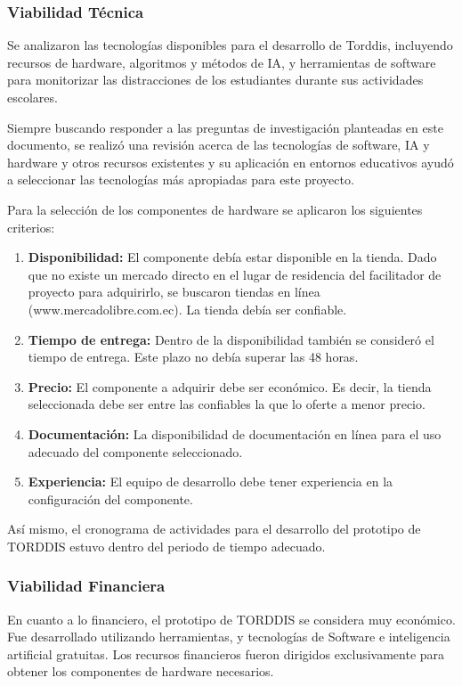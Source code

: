 \documentclass[a4paper,fleqn]{cas-sc}
\begin{document}
				\subsubsection*{Viabilidad Técnica}
					Se analizaron las tecnologías disponibles para el desarrollo de Torddis, incluyendo recursos de hardware, algoritmos y métodos de IA, y herramientas de software para monitorizar las distracciones de los estudiantes durante sus actividades escolares.
					
					Siempre buscando responder a las preguntas de investigación planteadas en este documento, se realizó una revisión acerca de las tecnologías de software, IA y hardware y otros recursos existentes y su aplicación en entornos educativos ayudó a seleccionar las tecnologías más apropiadas para este proyecto.
					
					Para la selección de los componentes de hardware se aplicaron los siguientes criterios:
					
					\begin{enumerate}
						\item \textbf{Disponibilidad:} El componente debía estar disponible en la tienda. Dado que no existe un mercado directo en el lugar de residencia del facilitador de proyecto para adquirirlo, se buscaron tiendas en línea (www.mercadolibre.com.ec). La tienda debía ser confiable. 
						\item \textbf{Tiempo de entrega:} Dentro de la disponibilidad también se consideró el tiempo de entrega. Este plazo no debía superar las 48 horas.
						\item \textbf{Precio:} El componente a adquirir debe ser económico. Es decir, la tienda seleccionada debe ser entre las confiables la que lo oferte a menor precio.
						\item \textbf{Documentación:} La disponibilidad de documentación en línea para el uso adecuado del componente seleccionado.
						\item \textbf{Experiencia:} El equipo de desarrollo debe tener experiencia en la configuración del componente.
					\end{enumerate}
					
					Así mismo, el cronograma de actividades para el desarrollo del prototipo de TORDDIS estuvo dentro del periodo de tiempo adecuado.
				
				\subsubsection*{Viabilidad Financiera}
					En cuanto a lo financiero, el prototipo de TORDDIS se considera muy económico. Fue desarrollado utilizando herramientas, y tecnologías de Software e inteligencia artificial gratuitas. Los recursos financieros fueron dirigidos exclusivamente para obtener los componentes de hardware necesarios.
					
\end{document}
